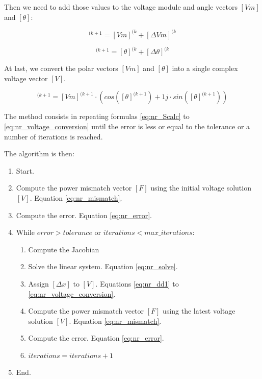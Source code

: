 \documentclass[nols,a4paper,twoside,notoc,fleqn]{tufte-book}
\begin{document}
Then we need to add those values to the voltage module and angle vectors $[Vm]$ and $[\theta]$:

\begin{equation}
[Vm]^{(k+1} = [Vm]^{(k} + [\Delta Vm]^{(k}
\end{equation}


\begin{equation}
[\theta]^{(k+1} = [\theta]^{(k} + [\Delta \theta]^{(k}
\end{equation}

At last, we convert the polar vectors  $[Vm]$ and $[\theta]$ into a single complex voltage vector $[V]$.

\begin{equation}
[V]^{(k+1} = [Vm]^{(k+1} \cdot \left( cos([\theta]^{(k+1}) + 1j \cdot sin([\theta]^{(k+1})\right)
\label{eq:nr_voltage_conversion}
\end{equation}

The method consists in repeating formulas \ref{eq:nr_Scalc} to \ref{eq:nr_voltage_conversion} until the error is less or equal to the tolerance or a number of iterations is reached.

The algorithm is then:

\begin{enumerate}

\item Start.

\item Compute the power mismatch vector $[F]$ using the initial voltage solution $[V]$. Equation \ref{eq:nr_mismatch}.

\item Compute the error. Equation \ref{eq:nr_error}.

\item While $error > tolerance$ or $iterations < max\_iterations$:

	\begin{enumerate}
	\item Compute the Jacobian
	
	\item Solve the linear system. Equation \ref{eq:nr_solve}.
	
	\item Assign $[\Delta x]$ to $[V]$. Equations \ref{eq:nr_dd1} to \ref{eq:nr_voltage_conversion}.
	
	\item Compute the power mismatch vector $[F]$ using the latest voltage solution $[V]$. Equation \ref{eq:nr_mismatch}.
	
	\item Compute the error. Equation \ref{eq:nr_error}.
	
	\item $iterations = iterations + 1$
	\end{enumerate}

\item End.
\end{enumerate}
\end{document}
